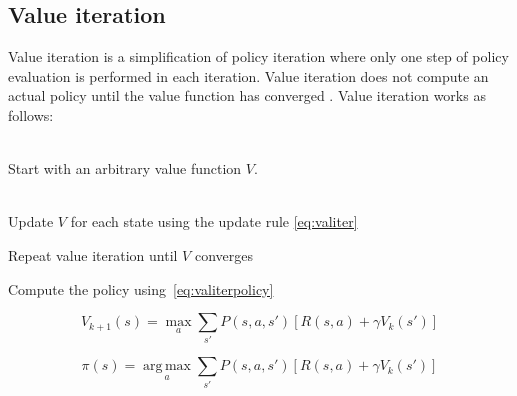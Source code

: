\subsection{Value iteration}
\label{sec:valueiteration}

Value iteration is a simplification of policy iteration where only one step of
policy evaluation is performed in each iteration. Value iteration does not compute an actual
policy until the value function has converged \parencite{barto1998reinforcement}. Value iteration works as follows:

\begin{description}
\item[Initialization] \hfill \\
    Start with an arbitrary value function $V$.
\item[Value iteration] \hfill \\
    Update $V$ for each state using the update rule \eqref{eq:valiter}
\item Repeat value iteration until $V$ converges
\item Compute the policy using~\eqref{eq:valiterpolicy}
\end{description}

\begin{equation} \label{eq:valiter}
V_{k+1}(s) = \max_a \sum_{s'}{P(s, a, s') \left[R(s, a) + \gamma V_k(s')\right]}
\end{equation}

\begin{equation} \label{eq:valiterpolicy}
\pi(s) = \operatorname*{arg\,max}_a \sum_{s'}{P(s, a, s') \left[R(s, a) + \gamma V_k(s')\right]}
\end{equation}
